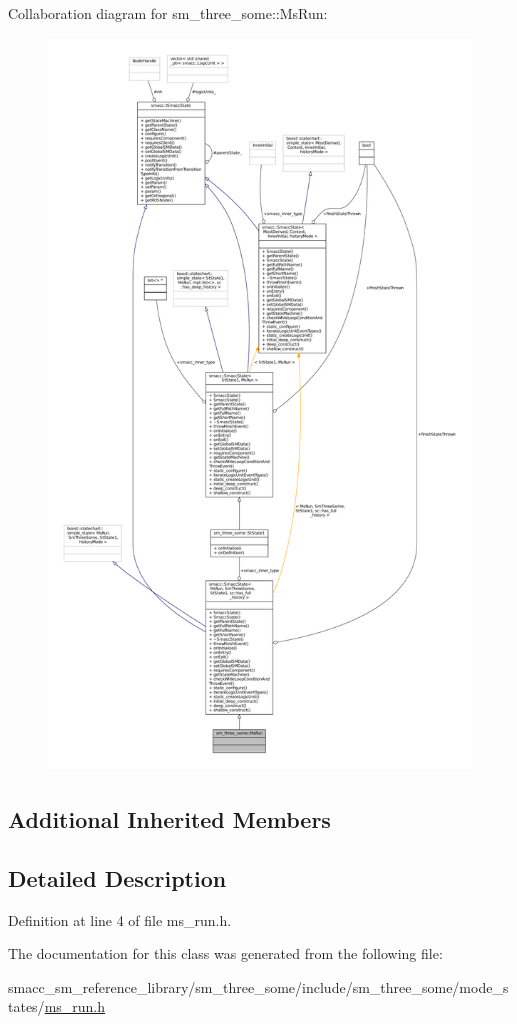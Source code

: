 Collaboration diagram for sm\+\_\+three\+\_\+some\+:\+:Ms\+Run\+:
\nopagebreak
\begin{figure}[H]
\begin{center}
\leavevmode
\includegraphics[height=550pt]{classsm__three__some_1_1MsRun__coll__graph}
\end{center}
\end{figure}
\subsection*{Additional Inherited Members}


\subsection{Detailed Description}


Definition at line 4 of file ms\+\_\+run.\+h.



The documentation for this class was generated from the following file\+:\begin{DoxyCompactItemize}
\item 
smacc\+\_\+sm\+\_\+reference\+\_\+library/sm\+\_\+three\+\_\+some/include/sm\+\_\+three\+\_\+some/mode\+\_\+states/\hyperlink{ms__run_8h}{ms\+\_\+run.\+h}\end{DoxyCompactItemize}
